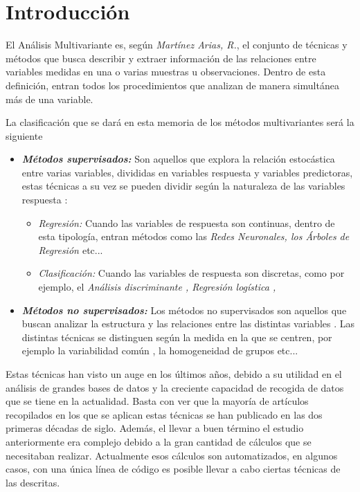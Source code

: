 \chapter*{Introducción}
\noindent El Análisis Multivariante es, según \textit{Martínez Arias, R.}\cite{Rosario 1999}, el conjunto de técnicas y métodos que busca describir y extraer información de las relaciones entre variables medidas en una o varias muestras u observaciones. Dentro de esta definición, entran todos los procedimientos que analizan de manera simultánea más de una variable. 

\noindent La clasificación que se dará en esta memoria de los métodos multivariantes será la siguiente 
\begin{itemize}
\item \textbf{\textit{Métodos supervisados:}} Son aquellos que explora la relación estocástica entre varias variables, divididas en variables respuesta y variables predictoras, estas técnicas a su vez se pueden dividir según la naturaleza de las variables respuesta \cite{James 2013}:
\begin{itemize}
\item \textit{Regresión: } Cuando las variables de respuesta son continuas, dentro de esta tipología, entran métodos como las  \emph{Redes Neuronales\cite{Mamidi 2021}, los Árboles  de Regresión \cite{Nerini 2007} }etc...
\item \textit{Clasificación: }Cuando las variables de respuesta son discretas, como por ejemplo, el \emph{Análisis discriminante \cite{Diez 2002}, Regresión logística \cite{Ensum 2005}, }
\end{itemize}
\item \textbf{\textit{Métodos no supervisados: }} Los métodos no supervisados son aquellos que buscan analizar la estructura y las relaciones entre las distintas variables \cite{Hastie 2001}. Las distintas técnicas se distinguen según la medida en la que se centren, por ejemplo la variabilidad común \cite{Pages 2005}, la homogeneidad de grupos \cite{Okazaki 2006} etc...
\end{itemize}

\noindent Estas técnicas han visto un auge en los últimos años, debido a su utilidad en el análisis de grandes bases de datos y la creciente capacidad de recogida de datos que se tiene en la actualidad. Basta con ver que la mayoría de artículos recopilados en los que se aplican estas técnicas se han publicado en las dos primeras décadas de siglo. Además, el llevar a buen término el estudio anteriormente era complejo debido a la gran cantidad de cálculos que se necesitaban realizar. Actualmente esos cálculos son automatizados, en algunos casos, con una única línea de código es posible llevar a cabo ciertas técnicas de las descritas.

